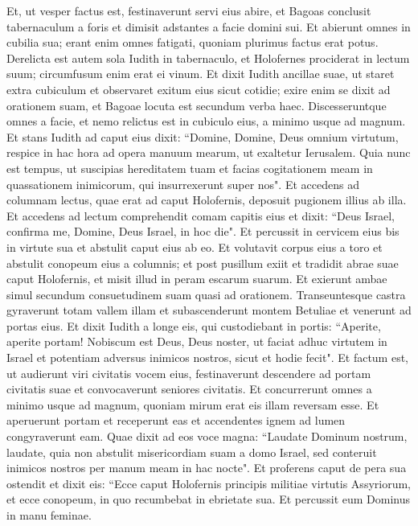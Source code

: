 \begin{biblechapter}  
\verse Et, ut vesper factus est, festinaverunt servi eius abire, et Bagoas conclusit tabernaculum a foris et dimisit adstantes a facie domini sui. Et abierunt omnes in cubilia sua; erant enim omnes fatigati, quoniam plurimus factus erat potus. 
\verse Derelicta est autem sola Iudith in tabernaculo, et Holofernes prociderat in lectum suum; circumfusum enim erat ei vinum. 
\verse Et dixit Iudith ancillae suae, ut staret extra cubiculum et observaret exitum eius sicut cotidie; exire enim se dixit ad orationem suam, et Bagoae locuta est secundum verba haec. 
\verse Discesseruntque omnes a facie, et nemo relictus est in cubiculo eius, a minimo usque ad magnum. Et stans Iudith ad caput eius dixit: “Domine, Domine, Deus omnium virtutum, respice in hac hora ad opera manuum mearum, ut exaltetur Ierusalem. 
\verse Quia nunc est tempus, ut suscipias hereditatem tuam et facias cogitationem meam in quassationem inimicorum, qui insurrexerunt super nos".  
\verse Et accedens ad columnam lectus, quae erat ad caput Holofernis, deposuit pugionem illius ab illa. 
\verse Et accedens ad lectum comprehendit comam capitis eius et dixit: “Deus Israel, confirma me, Domine, Deus Israel, in hoc die".  
\verse Et percussit in cervicem eius bis in virtute sua et abstulit caput eius ab eo.  
\verse Et volutavit corpus eius a toro et abstulit conopeum eius a columnis; et post pusillum exiit et tradidit abrae suae caput Holofernis, 
\verse et misit illud in peram escarum suarum. Et exierunt ambae simul secundum consuetudinem suam quasi ad orationem. Transeuntesque castra gyraverunt totam vallem illam et subascenderunt montem Betuliae et venerunt ad portas eius. 
\verse Et dixit Iudith a longe eis, qui custodiebant in portis: “Aperite, aperite portam! Nobiscum est Deus, Deus noster, ut faciat adhuc virtutem in Israel et potentiam adversus inimicos nostros, sicut et hodie fecit". 
\verse Et factum est, ut audierunt viri civitatis vocem eius, festinaverunt descendere ad portam civitatis suae et convocaverunt seniores civitatis. 
\verse Et concurrerunt omnes a minimo usque ad magnum, quoniam mirum erat eis illam reversam esse. Et aperuerunt portam et receperunt eas et accendentes ignem ad lumen congyraverunt eam. 
\verse Quae dixit ad eos voce magna: “Laudate Dominum nostrum, laudate, quia non abstulit misericordiam suam a domo Israel, sed conteruit inimicos nostros per manum meam in hac nocte". 
\verse Et proferens caput de pera sua ostendit et dixit eis: “Ecce caput Holofernis principis militiae virtutis Assyriorum, et ecce conopeum, in quo recumbebat in ebrietate sua. Et percussit eum Dominus in manu feminae. 

\end{biblechapter}
